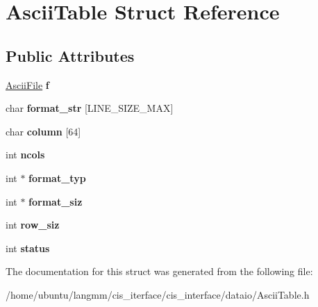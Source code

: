 \hypertarget{structAsciiTable}{}\section{Ascii\+Table Struct Reference}
\label{structAsciiTable}
\subsection*{Public Attributes}
\begin{DoxyCompactItemize}
\item 
\mbox{\label{structAsciiTable_a6b71c65c319ebb789ff5a2a912b35d0c}} 
\hyperlink{structAsciiFile}{Ascii\+File} {\bfseries f}
\item 
\mbox{\label{structAsciiTable_a02c0c95bda1032efb7d36ed046a81161}} 
char {\bfseries format\+\_\+str} \mbox{[}L\+I\+N\+E\+\_\+\+S\+I\+Z\+E\+\_\+\+M\+AX\mbox{]}
\item 
\mbox{\label{structAsciiTable_a9d1eb5cae7de5f8086e13e77ab677cfd}} 
char {\bfseries column} \mbox{[}64\mbox{]}
\item 
\mbox{\label{structAsciiTable_a8fb623eb767592c944c925e4fdf39630}} 
int {\bfseries ncols}
\item 
\mbox{\label{structAsciiTable_a2071d95515e2c0f1d6d3df70d37f1905}} 
int $\ast$ {\bfseries format\+\_\+typ}
\item 
\mbox{\label{structAsciiTable_a697bf776cdb1d3d98197b0c8a574d8af}} 
int $\ast$ {\bfseries format\+\_\+siz}
\item 
\mbox{\label{structAsciiTable_a0182498c6504b0b60b7a803409b330e6}} 
int {\bfseries row\+\_\+siz}
\item 
\mbox{\label{structAsciiTable_a782403a4fbf29b3b6dceabec0282c83d}} 
int {\bfseries status}
\end{DoxyCompactItemize}


The documentation for this struct was generated from the following file\+:\begin{DoxyCompactItemize}
\item 
/home/ubuntu/langmm/cis\+\_\+iterface/cis\+\_\+interface/dataio/Ascii\+Table.\+h\end{DoxyCompactItemize}
